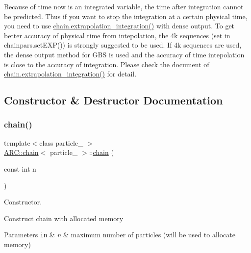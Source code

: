 Because of time now is an integrated variable, the time after integration cannot be predicted. Thus if you want to stop the integration at a certain physical time, you need to use \hyperlink{classARC_1_1chain_acd19e23d46d38d66c5eb60a2e9afe727}{chain.\+extrapolation\+\_\+integration()} with dense output. To get better accuracy of physical time from intepolation, the 4k sequences (set in chainpars.\+set\+E\+X\+P()) is strongly suggested to be used. If 4k sequences are used, the dense output method for G\+BS is used and the accuracy of time intepolation is close to the accuracy of integration. Please check the document of \hyperlink{classARC_1_1chain_acd19e23d46d38d66c5eb60a2e9afe727}{chain.\+extrapolation\+\_\+integration()} for detail. 

\subsection{Constructor \& Destructor Documentation}
\hypertarget{classARC_1_1chain_a57b7cc99d82b1228aefc88d0c5feb509}{}\label{classARC_1_1chain_a57b7cc99d82b1228aefc88d0c5feb509} 
\subsubsection{\texorpdfstring{chain()}{chain()}\hspace{0.1cm}{\footnotesize\ttfamily [1/2]}}
{\footnotesize\ttfamily template$<$class particle\+\_\+ $>$ \\
\hyperlink{classARC_1_1chain}{A\+R\+C\+::chain}$<$ particle\+\_\+ $>$\+::\hyperlink{classARC_1_1chain}{chain} (\begin{DoxyParamCaption}\item[{const int}]{n }\end{DoxyParamCaption})\hspace{0.3cm}{\ttfamily [inline]}}



Constructor. 

Construct chain with allocated memory 
\begin{DoxyParams}[1]{Parameters}
\mbox{\tt in}  & {\em n} & maximum number of particles (will be used to allocate memory) \\
\hline
\end{DoxyParams}
\hypertarget{classARC_1_1chain_a8590b2bc343867d9ef246946f3002063}{}\label{classARC_1_1chain_a8590b2bc343867d9ef246946f3002063} 

